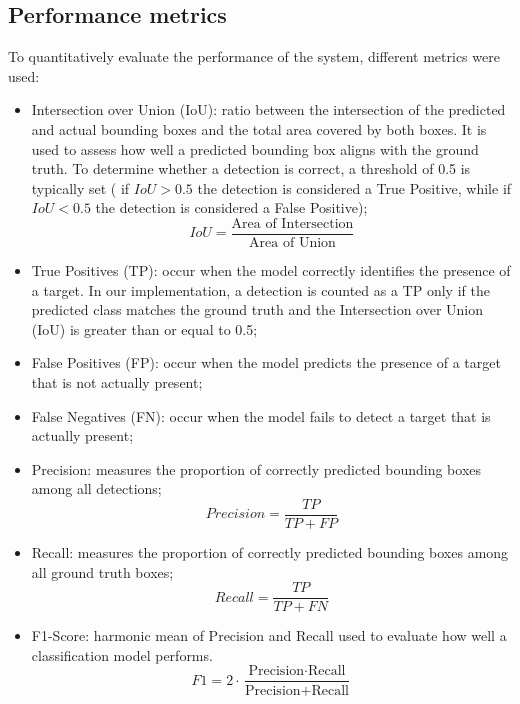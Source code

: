 \subsection{Performance metrics}
To quantitatively evaluate the performance of the system, different metrics were used:
\begin{itemize}
    \item Intersection over Union (IoU): ratio between the intersection of the predicted and actual
    bounding boxes and the total area covered by both boxes. It is used to assess how well a predicted bounding box
    aligns with the ground truth. To determine whether a detection is correct, a threshold of 0.5 is typically set (
    if $IoU > 0.5$ the detection is considered a True Positive, while if $IoU < 0.5$ the detection is considered a False Positive);
    \[ IoU = \frac{\text{Area of Intersection}}{\text{Area of Union}} \]
    \item True Positives (TP): occur when the model correctly identifies the presence of a target. In our implementation, a detection is counted as a TP 
    only if the predicted class matches the ground truth and the Intersection over Union (IoU) is greater than or equal to 0.5;
    \item False Positives (FP): occur when the model predicts the presence of a target that is not actually present;
    \item False Negatives (FN): occur when the model fails to detect a target that is actually present;
    \item Precision: measures the proportion of correctly predicted bounding boxes among all detections;
    \[ Precision = \frac{TP}{TP + FP} \]
    \item Recall: measures the proportion of correctly predicted bounding boxes among all ground truth boxes;
    \[ Recall = \frac{TP}{TP + FN} \]
    \item F1-Score: harmonic mean of Precision and Recall used to evaluate how well a classification model performs.
    \[  F1 = 2 \cdot \frac{\text{Precision} \cdot \text{Recall}}{\text{Precision} + \text{Recall}} \]
\end{itemize}